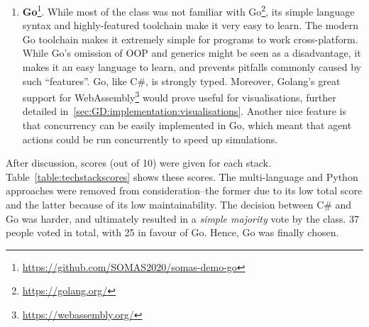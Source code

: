 \begin{enumerate}
    \item \textbf{Go}\footnote{\url{https://github.com/SOMAS2020/somas-demo-go}}.
          While most of the class was not familiar with Go\footnote{\url{https://golang.org/}}, its simple language syntax and highly-featured toolchain make it very easy to learn. The modern Go toolchain makes it extremely simple for programs to work cross-platform. While Go's omission of OOP and generics might be seen as a disadvantage, it makes it an easy language to learn, and prevents pitfalls commonly caused by such ``features''. Go, like C\#, is strongly typed. Moreover, Golang's great support for WebAssembly\footnote{\url{https://webassembly.org/}} would prove useful for visualisations, further detailed in~\ref{sec:GD:implementation:visualisations}. Another nice feature is that concurrency can be easily implemented in Go, which meant that agent actions could be run concurrently to speed up simulations.
\end{enumerate}

After discussion, scores (out of 10) were given for each stack. Table~\ref{table:techstackscores} shows these scores. The multi-language and Python approaches were removed from consideration--the former due to its low total score and the latter because of its low maintainability. The decision between C\# and Go was harder, and ultimately resulted in a \emph{simple majority} vote by the class. 37 people voted in total, with 25 in favour of Go. Hence, Go was finally chosen.

